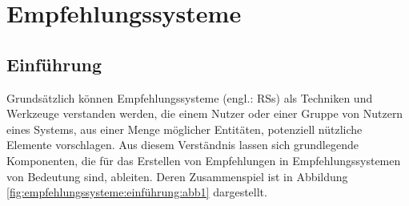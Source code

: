 
\chapter{Empfehlungssysteme}
\label{ch:empfehlungssysteme}

\section{Einführung}
\label{ch:empfehlungssysteme:einführung}
Grundsätzlich können Empfehlungssysteme (engl.: \acp{RS}) als Techniken und Werkzeuge \cite[S. 4]{ricci:inbook}\cite[S. 1]{yadav:inproceedings} verstanden werden, die einem Nutzer oder einer Gruppe von Nutzern eines Systems, aus einer Menge möglicher Entitäten, potenziell nützliche Elemente vorschlagen.
Aus diesem Verständnis lassen sich grundlegende Komponenten, die für das Erstellen von Empfehlungen in Empfehlungssystemen von Bedeutung sind, ableiten.
Deren Zusammenspiel ist in Abbildung \ref{fig:empfehlungssysteme:einführung:abb1} dargestellt.

